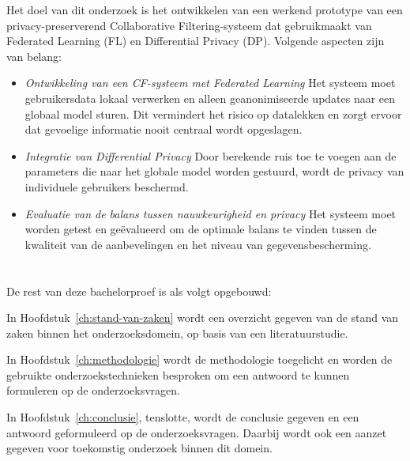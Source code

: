 Het doel van dit onderzoek is het ontwikkelen van een werkend prototype van een privacy-preserverend Collaborative Filtering-systeem dat gebruikmaakt van Federated Learning (FL) en Differential Privacy (DP). Volgende aspecten zijn van belang:
\begin{itemize}
  \item \textit{Ontwikkeling van een CF-systeem met Federated Learning}
  Het systeem moet gebruikersdata lokaal verwerken en alleen geanonimiseerde updates naar een globaal model sturen. Dit vermindert het risico op datalekken en zorgt ervoor dat gevoelige informatie nooit centraal wordt opgeslagen.
  \item \textit{Integratie van Differential Privacy}
  Door berekende ruis toe te voegen aan de parameters die naar het globale model worden gestuurd, wordt de privacy van individuele gebruikers beschermd.
  \item \textit{Evaluatie van de balans tussen nauwkeurigheid en privacy}
  Het systeem moet worden getest en geëvalueerd om de optimale balans te vinden tussen de kwaliteit van de aanbevelingen en het niveau van gegevensbescherming.
\end{itemize}

\section{}%
\label{sec:opzet-bachelorproef}


De rest van deze bachelorproef is als volgt opgebouwd:

In Hoofdstuk~\ref{ch:stand-van-zaken} wordt een overzicht gegeven van de stand van zaken binnen het onderzoeksdomein, op basis van een literatuurstudie.

In Hoofdstuk~\ref{ch:methodologie} wordt de methodologie toegelicht en worden de gebruikte onderzoekstechnieken besproken om een antwoord te kunnen formuleren op de onderzoeksvragen.


In Hoofdstuk~\ref{ch:conclusie}, tenslotte, wordt de conclusie gegeven en een antwoord geformuleerd op de onderzoeksvragen. Daarbij wordt ook een aanzet gegeven voor toekomstig onderzoek binnen dit domein.